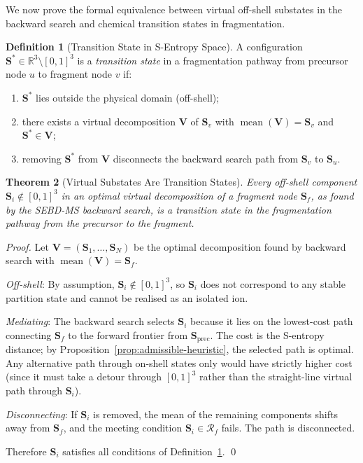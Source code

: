 \documentclass[twocolumn,10pt,a4paper]{article}
\theoremstyle{thmstyle}
\newtheorem{theorem}{Theorem}[section]
\theoremstyle{definition}
\newtheorem{definition}[theorem]{Definition}
\theoremstyle{remark}
\newcommand{\R}{\mathbb{R}}
\newcommand{\Sv}{\mathbf{S}}
\newcommand{\Reachf}{\mathcal{R}_f}
\DeclareMathOperator{\mean}{mean}
\begin{document}
We now prove the formal equivalence between virtual off-shell substates
in the backward search and chemical transition states in fragmentation.

\begin{definition}[Transition State in S-Entropy Space]
\label{def:transition-state}
A configuration $\Sv^* \in \R^3 \setminus [0,1]^3$ is a
\emph{transition state} in a fragmentation pathway from precursor node
$u$ to fragment node $v$ if:
\begin{enumerate}[nosep,label=(\roman*)]
\item $\Sv^*$ lies outside the physical domain (off-shell);
\item there exists a virtual decomposition $\mathbf{V}$ of $\Sv_v$
  with $\mean(\mathbf{V}) = \Sv_v$ and $\Sv^* \in \mathbf{V}$;
\item removing $\Sv^*$ from $\mathbf{V}$ disconnects the backward
  search path from $\Sv_v$ to $\Sv_u$.
\end{enumerate}
\end{definition}

\begin{theorem}[Virtual Substates Are Transition States]
\label{thm:virtual-ts}
Every off-shell component $\Sv_i \notin [0,1]^3$ in an optimal virtual
decomposition of a fragment node $\Sv_f$, as found by the SEBD-MS
backward search, is a transition state in the fragmentation pathway
from the precursor to the fragment.
\end{theorem}

\begin{proof}
Let $\mathbf{V} = (\Sv_1, \ldots, \Sv_N)$ be the optimal decomposition
found by backward search with $\mean(\mathbf{V}) = \Sv_f$.

\textit{Off-shell}: By assumption, $\Sv_i \notin [0,1]^3$, so $\Sv_i$
does not correspond to any stable partition state and cannot be realised
as an isolated ion.

\textit{Mediating}: The backward search selects $\Sv_i$ because it
lies on the lowest-cost path connecting $\Sv_f$ to the forward
frontier from $\Sv_\text{prec}$. The cost is the S-entropy distance;
by Proposition~\ref{prop:admissible-heuristic}, the selected path is
optimal. Any alternative path through on-shell states only would have
strictly higher cost (since it must take a detour through $[0,1]^3$
rather than the straight-line virtual path through $\Sv_i$).

\textit{Disconnecting}: If $\Sv_i$ is removed, the mean of the remaining
components shifts away from $\Sv_f$, and the meeting condition
$\Sv_i \in \Reachf$ fails. The path is disconnected.

Therefore $\Sv_i$ satisfies all conditions of Definition~\ref{def:transition-state}.
\qed
\end{proof}
\end{document}
